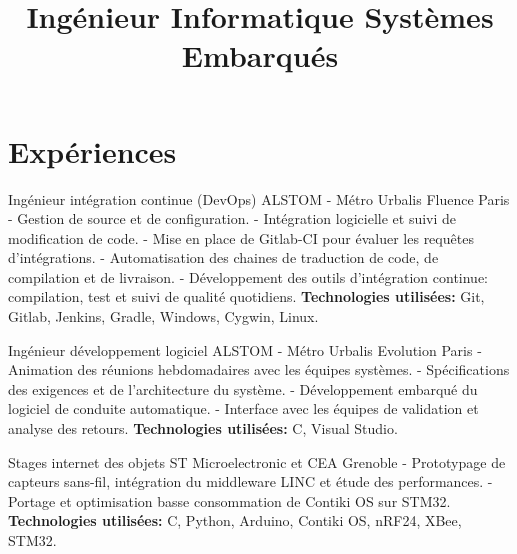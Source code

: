 \documentclass[10pt,a4paper]{moderncv}
\title{\large Ingénieur Informatique Systèmes Embarqués}
\begin{document}
\maketitle

\section{Expériences}

  {Ingénieur intégration continue (DevOps)}
  {ALSTOM - Métro Urbalis Fluence}
  {}
  {Paris}
  {- Gestion de source et de configuration. \newline{}
  - Intégration logicielle et suivi de modification de code. \newline{}
  - Mise en place de Gitlab-CI pour évaluer les requêtes d'intégrations.\newline{} 
  - Automatisation des chaines de traduction de code, de compilation et de livraison.\newline{} 
  - Développement des outils d'intégration continue: compilation, test et suivi de qualité quotidiens.\newline{} 
  \newline{}
  \textbf{Technologies utilisées:} Git, Gitlab, Jenkins, Gradle, Windows, Cygwin, Linux.\newline{}}
  
  {Ingénieur développement logiciel}
  {ALSTOM - Métro Urbalis Evolution}
  {}
  {Paris}
  {- Animation des réunions hebdomadaires avec les équipes systèmes.\newline{}
  - Spécifications des exigences et de l’architecture du système.\newline{}
  - Développement embarqué du logiciel de conduite automatique.\newline{}
  - Interface avec les équipes de validation et analyse des retours.\newline{}
  \newline{}
  \textbf{Technologies utilisées:} C, Visual Studio.\newline{}}

  {Stages internet des objets}
  {ST Microelectronic et CEA}
  {}
  {Grenoble}
  {- Prototypage de capteurs sans-fil, intégration du middleware LINC et étude des performances.\newline{}
  - Portage et optimisation basse consommation de Contiki OS sur STM32.\newline{}
   \newline{}
   \textbf{Technologies utilisées:} C, Python, Arduino, Contiki OS, nRF24, XBee, STM32.\newline{}}
\end{document}
